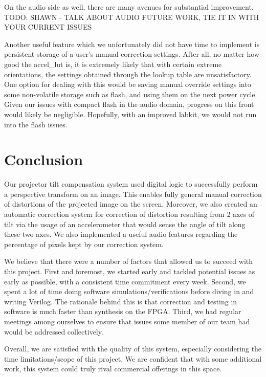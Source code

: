 \documentclass{article}
\begin{document}
On the audio side as well, there are many avenues for substantial improvement.
TODO: SHAWN - TALK ABOUT AUDIO FUTURE WORK, TIE IT IN WITH YOUR CURRENT ISSUES

Another useful feature which we unfortunately did not have time to implement is persistent storage of a user's manual correction settings.
After all, no matter how good the accel\_lut is, it is extremely likely that with certain extreme orientations,
the settings obtained through the lookup table are unsatisfactory.
One option for dealing with this would be saving manual override settings into some non-volatile storage such as flash,
and using them on the next power cycle.
Given our issues with compact flash in the audio domain, progress on this front would likely be negligible.
Hopefully, with an improved labkit, we would not run into the flash issues.

\section{Conclusion}
Our projector tilt compensation system used digital logic to successfully perform a perspective transform on an image.
This enables fully general manual correction of distortions of the projected image on the screen.
Moreover, we also created an automatic correction system for correction of distortion resulting from 2 axes of tilt
via the usage of an accelerometer that would sense the angle of tilt along these two axes.
We also implemented a useful audio features regarding the percentage of pixels kept by our correction system.

We believe that there were a number of factors that allowed us to succeed with this project.
First and foremost, we started early and tackled potential issues as early as possible, with a consistent time commitment every week.
Second, we spent a lot of time doing software simulations/verifications before diving in and writing Verilog.
The rationale behind this is that correction and testing in software is much faster than synthesis on the FPGA.
Third, we had regular meetings among ourselves to ensure that issues some member of our team had would be addressed collectively.

Overall, we are satisfied with the quality of this system,
especially considering the time limitations/scope of this project.
We are confident that with some additional work,
this system could truly rival commercial offerings in this space.



\newpage
\end{document}
